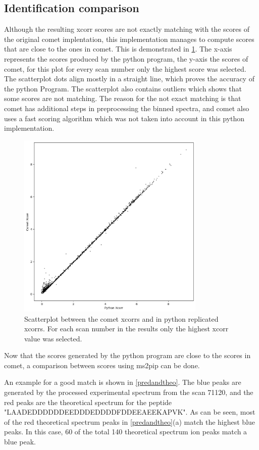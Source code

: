 \documentclass[11pt]{article}
\begin{document}
\subsection{Identification comparison}
Although the resulting xcorr scores are not exactly matching with the scores of the original comet implentation, this implementation manages to compute scores that are close to the ones in comet. This is demonstrated in \cref{fig:scatterplot}. The x-axis represents the scores produced by the python program, the y-axis the scores of comet, for this plot for every scan number only the highest score was selected. The scatterplot dots align mostly in a straight line, which proves the accuracy of the python Program. The scatterplot also contains outliers which shows that some scores are not matching. The reason for the not exact matching is that comet has additional steps in preprocessing the binned spectra, and comet also uses a fast scoring algorithm which was not taken into account in this python implementation. 
\begin{figure}[ht]
\centering
\includegraphics[width=0.8\textwidth]{figs/scatterplot.png}
\caption{Scatterplot between the comet xcorrs and in python replicated xcorrs. For each scan number in the results only the highest xcorr value was selected.}
\label{fig:scatterplot}
\end{figure}

Now that the scores generated by the python program are close to the scores in comet, a comparison between scores using ms2pip can be done.

An example for a good match is shown in \cref{predandtheo}. The blue peaks are generated by the processed experimental spectrum from the scan 71120, and the red peaks are the theoretical spectrum for the peptide "LAADEDDDDDDEEDDDEDDDDFDDEEAEEKAPVK". As can be seen, most of the red theoretical spectrum peaks in \cref{predandtheo}(a) match the highest blue peaks. In this case, 60 of the total 140 theoretical spectrum ion peaks match a blue peak. 
\end{document}
